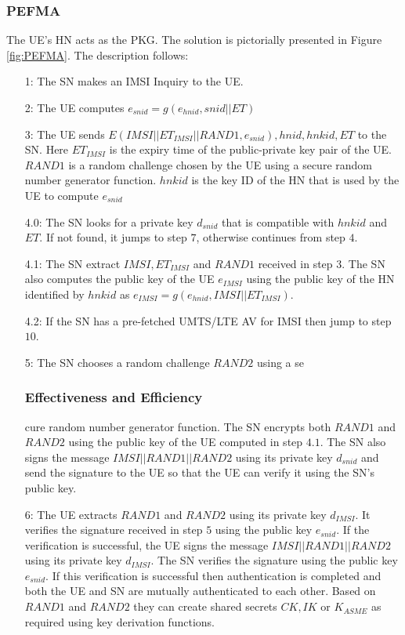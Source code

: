 \documentclass{river-journal}
\begin{document}
\subsubsection{PEFMA}
The UE's HN acts as the PKG. The solution is pictorially presented in Figure \ref{fig:PEFMA}. The description follows:

\begin{itemize}
\item[1:] The SN makes an IMSI Inquiry to the UE. 
\item[2:] The UE computes $e_{snid} = g\left(e_{hnid},snid||ET \right)$
\item[3:] The UE sends $E(IMSI||ET_{IMSI}||RAND1,e_{snid}),hnid,hnkid,ET$ to the SN. Here $ET_{IMSI}$ is the expiry time of the public-private key pair of the UE. $RAND1$ is a random challenge chosen by the UE using a secure random number generator function. $hnkid$ is the key ID of the HN that is used by the UE to compute $e_{snid}$
\item[4.0:] The SN looks for a private key $d_{snid}$ that is compatible with $hnkid$ and $ET$. If not found, it jumps to step $7$, otherwise continues from step $4$.
\item[4.1:] The SN extract $IMSI,ET_{IMSI}$ and $RAND1$ received in step $3$. The SN also computes the public key of the UE $e_{IMSI}$ using the public key of the HN identified by $hnkid$ as $e_{IMSI} = g(e_{hnid},IMSI||ET_{IMSI})$.
\item[4.2:] If the SN has a pre-fetched UMTS/LTE AV for IMSI then jump to step $10$.
\item[5:] The SN chooses a random challenge $RAND2$ using a se\subsubsection{Effectiveness and Efficiency}cure random number generator function. The SN encrypts both $RAND1$ and $RAND2$ using the public key of the UE computed in step $4.1$. The SN also signs the message $IMSI||RAND1||RAND2$ using its private key $d_{snid}$ and send the signature to the UE so that the UE can verify it using the SN's public key. 
\item[6:] The UE extracts $RAND1$ and $RAND2$ using its private key $d_{IMSI}$. It verifies the signature received in step $5$ using the public key $e_{snid}$. If the verification is successful, the UE signs the message $IMSI||RAND1||RAND2$ using its private key $d_{IMSI}$. The SN verifies the signature using the public key $e_{snid}$. If this verification is successful then authentication is completed and both the UE and SN are mutually authenticated to each other. Based on $RAND1$ and $RAND2$ they can create shared secrets $CK,IK$ or $K_{ASME}$ as required using key derivation functions.


\end{itemize}
\end{document}
